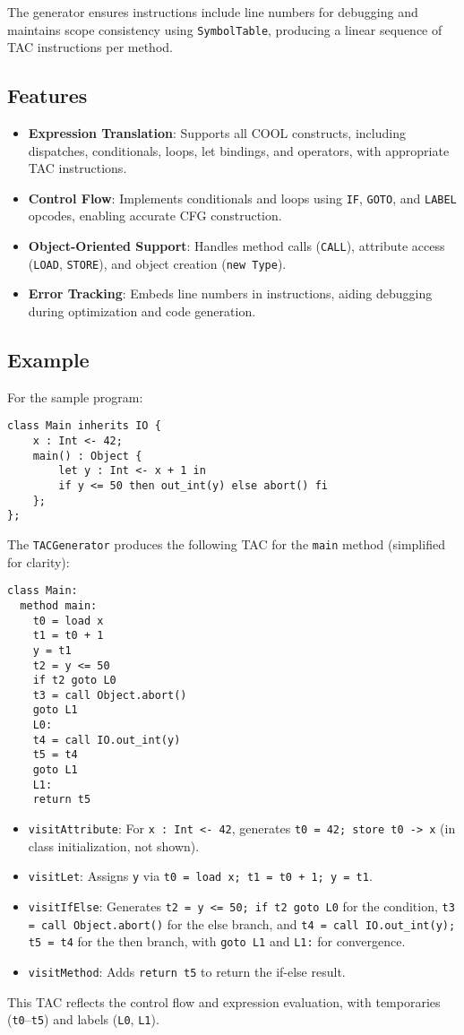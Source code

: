 \documentclass[11pt, titlepage]{article}
\begin{document}
The generator ensures instructions include line numbers for debugging and maintains scope consistency using \texttt{SymbolTable}, producing a linear sequence of TAC instructions per method.

\subsection{Features}
\begin{itemize}[leftmargin=*]
    \item \textbf{Expression Translation}: Supports all COOL constructs, including dispatches, conditionals, loops, let bindings, and operators, with appropriate TAC instructions.
    \item \textbf{Control Flow}: Implements conditionals and loops using \texttt{IF}, \texttt{GOTO}, and \texttt{LABEL} opcodes, enabling accurate CFG construction.
    \item \textbf{Object-Oriented Support}: Handles method calls (\texttt{CALL}), attribute access (\texttt{LOAD}, \texttt{STORE}), and object creation (\texttt{new Type}).
    \item \textbf{Error Tracking}: Embeds line numbers in instructions, aiding debugging during optimization and code generation.
\end{itemize}

\subsection{Example}
For the sample program:
\begin{lstlisting}
class Main inherits IO {
    x : Int <- 42;
    main() : Object {
        let y : Int <- x + 1 in
        if y <= 50 then out_int(y) else abort() fi
    };
};
\end{lstlisting}
The \texttt{TACGenerator} produces the following TAC for the \texttt{main} method (simplified for clarity):
\begin{lstlisting}
class Main:
  method main:
    t0 = load x
    t1 = t0 + 1
    y = t1
    t2 = y <= 50
    if t2 goto L0
    t3 = call Object.abort()
    goto L1
    L0:
    t4 = call IO.out_int(y)
    t5 = t4
    goto L1
    L1:
    return t5
\end{lstlisting}
\begin{itemize}[leftmargin=*]
    \item \texttt{visitAttribute}: For \texttt{x : Int <- 42}, generates \texttt{t0 = 42; store t0 -> x} (in class initialization, not shown).
    \item \texttt{visitLet}: Assigns \texttt{y} via \texttt{t0 = load x; t1 = t0 + 1; y = t1}.
    \item \texttt{visitIfElse}: Generates \texttt{t2 = y <= 50; if t2 goto L0} for the condition, \texttt{t3 = call Object.abort()} for the else branch, and \texttt{t4 = call IO.out\_int(y); t5 = t4} for the then branch, with \texttt{goto L1} and \texttt{L1:} for convergence.
    \item \texttt{visitMethod}: Adds \texttt{return t5} to return the if-else result.
\end{itemize}
This TAC reflects the control flow and expression evaluation, with temporaries (\texttt{t0}–\texttt{t5}) and labels (\texttt{L0}, \texttt{L1}).
\end{document}
